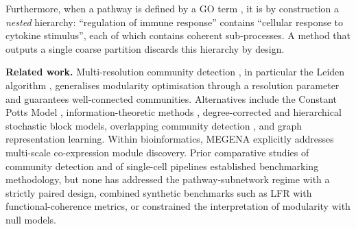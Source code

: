 \documentclass[twocolumn,10pt,letterpaper]{article}
\begin{document}
Furthermore, when a pathway is defined by a GO term \citep{ashburner2000go}, it is by
construction a \emph{nested} hierarchy: ``regulation of immune response'' contains ``cellular response to cytokine
stimulus'', each of which contains coherent sub-processes. A method that outputs a single
coarse partition discards this hierarchy by design.

\noindent\textbf{Related work.} Multi-resolution community detection \citep{newman2004girvan}, in
particular the Leiden algorithm \citep{traag2019leiden}, generalises modularity optimisation
through a resolution parameter and guarantees well-connected communities. Alternatives
include the Constant Potts Model \citep{traag2011cpm}, information-theoretic methods
\citep{rosvall2008infomap}, degree-corrected and hierarchical stochastic block models,
overlapping community detection \citep{ahn2010link,lancichinetti2011oslom}, and graph
representation learning. Within bioinformatics, MEGENA \citep{song2015megena} explicitly
addresses multi-scale co-expression module discovery. Prior comparative studies of community
detection and of single-cell pipelines \citep{luecken2019benchmark} established benchmarking
methodology, but none has addressed the pathway-subnetwork regime with a strictly paired
design, combined synthetic benchmarks such as LFR \citep{lancichinetti2008lfr} with
functional-coherence metrics, or constrained the interpretation of modularity with null
models.
\end{document}
